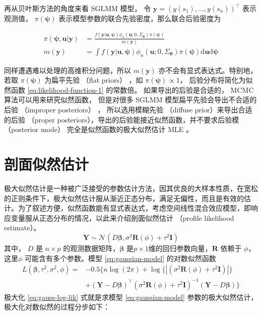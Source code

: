 \documentclass[12pt,a4paper,UTF8,twoside]{book}
\theoremstyle{definition}
\theoremstyle{definition}
\theoremstyle{definition}
\theoremstyle{remark}
\begin{document}
再从贝叶斯方法的角度来看 SGLMM 模型， 令 \(\mathbf{y} = (y(s_1),\ldots,y(s_n))^{\top}\) 表示观测值， \(\pi(\boldsymbol{\psi})\) 表示模型参数的联合先验密度，那么联合后验密度为

\begin{equation}
\begin{aligned}
\pi(\boldsymbol{\psi},\mathbf{u}|\mathbf{y}) &= \frac{f(\mathbf{y|\mathbf{u}, \boldsymbol{\psi}})\phi_{n}(\mathbf{u};0,\Sigma_{\boldsymbol{\theta}})\pi(\boldsymbol{\psi})}{m(\mathbf{y})} \\
m(\mathbf{y}) &= \int f(\mathbf{y|\mathbf{u}, \boldsymbol{\psi}})\phi_{n}(\mathbf{u};0,\Sigma_{\boldsymbol{\theta}})\pi(\boldsymbol{\psi})\mathrm{d} \mathbf{u} \mathrm{d} \boldsymbol{\psi}
\end{aligned}
\end{equation}

\noindent 同样遭遇难以处理的高维积分问题，所以 \(m(\mathbf{y})\) 亦不会有显式表达式。特别地，若取 \(\pi(\boldsymbol{\psi})\) 为扁平先验 （flat priors） ，如 \(\pi(\boldsymbol{\psi}) \propto 1\)， 后验分布将简化为似然函数 \eqref{eq:likelihood-function-1} 的常数倍。 如果导出的后验是合适的， MCMC 算法可以用来研究似然函数， 但是对很多 SGLMM 模型扁平先验会导出不合适的后验 （improper posteriors） \citep{Natarajan1995}， 所以选用模糊先验 （diffuse prior）来导出合适的后验 （proper posteriors），导出的后验能接近似然函数，并不要求后验模 （posterior mode） 完全是似然函数的极大似然估计 MLE \citep{Robert1996JASA}。

\hypertarget{sec:profile-likelihood}{%
\section{剖面似然估计}\label{sec:profile-likelihood}}

极大似然估计是一种被广泛接受的参数估计方法，因其优良的大样本性质，在宽松的正则条件下，极大似然估计服从渐近正态分布，满足无偏性，而且是有效的估计。为了叙述方便，似然函数能有显式表达式，考虑空间线性混合效应模型，即响应变量服从正态分布的情况，以此来介绍剖面似然估计 （profile likelihood estimate）\citep{Diggle2007}。
\begin{equation}
\mathbf{Y} \sim \mathcal{N}(D\boldsymbol{\beta},\sigma^2 \mathbf{R}(\phi) + \tau^2\mathbf{I})
\label{eq:gaussian-model}
\end{equation}
\noindent 其中， \(D\) 是 \(n \times p\) 的观测数据矩阵，\(\boldsymbol{\beta}\) 是\(p\times 1\)维的回归参数向量，\(\mathbf{R}\) 依赖于 \(\phi\)，这里\(\phi\) 可能含有多个参数。模型 \eqref{eq:gaussian-model} 的对数似然函数
\begin{equation}
\begin{aligned}
L(\boldsymbol{\beta},\tau^2,\sigma^2,\phi) = {} 
 & - 0.5\{ n\log(2\pi) + \log\{|(\sigma^2\mathbf{R}(\phi)+\tau^2\mathbf{I})|\} \\
 & + (\mathbf{Y} - D\boldsymbol{\beta})^{\top}(\sigma^2\mathbf{R}(\phi)+\tau^2\mathbf{I})^{-1}(\mathbf{Y} - D\boldsymbol{\beta}) \}  
\end{aligned} \label{eq:gauss-log-lik}
\end{equation}
\noindent 极大化 \eqref{eq:gauss-log-lik} 式就是求模型 \eqref{eq:gaussian-model} 参数的极大似然估计，极大化对数似然的过程分步如下：
\end{document}
